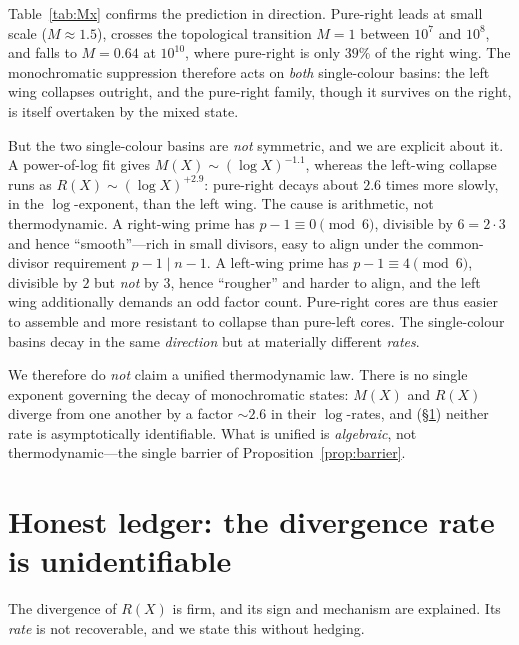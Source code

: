 \documentclass[11pt]{article}
\theoremstyle{plain}
\theoremstyle{definition}
\begin{document}
Table~\ref{tab:Mx} confirms the prediction in direction. Pure-right leads at small scale ($M\approx1.5$),
crosses the topological transition $M=1$ between $10^{7}$ and $10^{8}$, and falls to $M=0.64$ at
$10^{10}$, where pure-right is only $39\%$ of the right wing. The monochromatic suppression therefore
acts on \emph{both} single-colour basins: the left wing collapses outright, and the pure-right family,
though it survives on the right, is itself overtaken by the mixed state.

But the two single-colour basins are \emph{not} symmetric, and we are explicit about it. A power-of-log
fit gives $M(X)\sim(\log X)^{-1.1}$, whereas the left-wing collapse runs as $R(X)\sim(\log X)^{+2.9}$:
pure-right decays about $2.6$ times more slowly, in the $\log$-exponent, than the left wing. The cause
is arithmetic, not thermodynamic. A right-wing prime has $p-1\equiv0\pmod6$, divisible by $6=2\cdot3$ and
hence ``smooth''---rich in small divisors, easy to align under the common-divisor requirement $p-1\mid
n-1$. A left-wing prime has $p-1\equiv4\pmod6$, divisible by $2$ but \emph{not} by $3$, hence
``rougher'' and harder to align, and the left wing additionally demands an odd factor count. Pure-right
cores are thus easier to assemble and more resistant to collapse than pure-left cores. The single-colour
basins decay in the same \emph{direction} but at materially different \emph{rates}.

We therefore do \emph{not} claim a unified thermodynamic law. There is no single exponent governing the
decay of monochromatic states: $M(X)$ and $R(X)$ diverge from one another by a factor $\sim2.6$ in their
$\log$-rates, and (\S\ref{sec:ledger}) neither rate is asymptotically identifiable. What is unified is
\emph{algebraic}, not thermodynamic---the single barrier of Proposition~\ref{prop:barrier}.

\section{Honest ledger: the divergence rate is unidentifiable}\label{sec:ledger}
The divergence of $R(X)$ is firm, and its sign and mechanism are explained. Its \emph{rate} is not
recoverable, and we state this without hedging.
\end{document}
